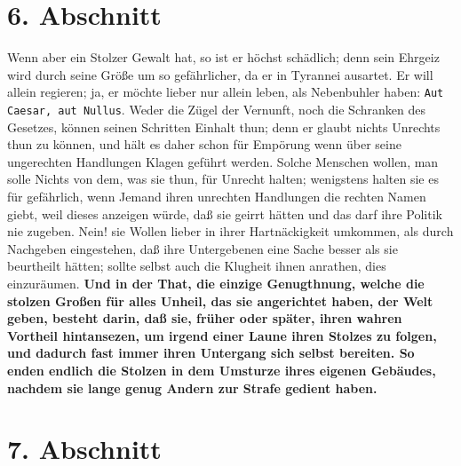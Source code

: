 \section{6. Abschnitt} \label{kap12_ab6}

Wenn aber ein Stolzer Gewalt hat, so ist er höchst
schädlich; denn sein Ehrgeiz
wird durch seine Größe um so gefährlicher, da er in Tyrannei
ausartet. Er will
allein regieren; ja, er möchte lieber nur allein leben, als Nebenbuhler haben:
\texttt{Aut Caesar, aut Nullus}. Weder die Zügel der Vernunft, noch die
Schranken des
Gesetzes, können seinen Schritten Einhalt thun; denn er glaubt nichts Unrechts
thun zu können, und hält es daher schon für Empörung wenn über seine ungerechten
Handlungen Klagen geführt werden. Solche Menschen wollen, man solle Nichts von
dem, was sie thun, für Unrecht halten; wenigstens halten sie es für gefährlich,
wenn Jemand ihren unrechten Handlungen die rechten Namen giebt, weil dieses
anzeigen würde, daß sie geirrt hätten und das darf ihre Politik nie zugeben.
Nein! sie Wollen lieber in ihrer Hartnäckigkeit umkommen, als durch Nachgeben
eingestehen, daß ihre Untergebenen eine Sache besser als sie beurtheilt hätten;
sollte selbst auch die Klugheit ihnen anrathen, dies einzuräumen. \textbf{Und in
der
That, die einzige Genugthnung, welche die stolzen Großen für alles Unheil, das
sie angerichtet haben, der Welt geben, besteht darin, daß sie, früher oder
später, ihren wahren Vortheil hintansezen, um irgend einer Laune ihren Stolzes
zu folgen, und dadurch fast immer ihren Untergang sich selbst bereiten. So enden
endlich die Stolzen in dem Umsturze ihres eigenen Gebäudes, nachdem sie lange
genug Andern zur Strafe gedient haben.}

\section{7. Abschnitt} \label{kap12_ab7}

